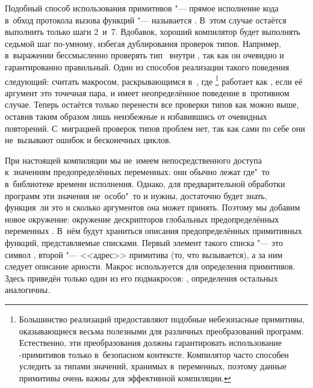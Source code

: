 Подобный способ использования примитивов "--- прямое исполнение кода в~обход
протокола вызова функций "--- называется . В~этом случае
остаётся выполнить только шаги 2~и~7. Вдобавок, хороший компилятор будет
выполнять седьмой шаг по-умному, избегая дублирования проверок типов. Например,
в~выражении  бессмысленно проверять тип~
внутри , так как он очевидно и гарантированно правильный. Один из
способов реализации такого поведения следующий: считать 
макросом, раскрывающимся в~, где \footnote{Большинство
реализаций предоставляют подобные небезопасные примитивы, оказывающиеся весьма
полезными для различных преобразований программ. Естественно, эти преобразования
должны гарантировать использование -примитивов только в~безопасном
контексте. Компилятор часто способен уследить за типами значений, хранимых
в~переменных, поэтому данные примитивы очень важны для эффективной компиляции.}
работает как , если её аргумент это точечная пара, и имеет
неопределённое поведение в~противном случае. Теперь остаётся только перенести
все проверки типов как можно выше, оставив таким образом лишь неизбежные и
избавившись от очевидных повторений. С~миграцией проверок типов проблем нет, так
как сами по себе они не~вызывают ошибок и бесконечных циклов.

При настоящей компиляции мы не~имеем непосредственного доступа к~значениям
предопределённых переменных: они обычно лежат где"~то в~библиотеке времени
исполнения. Однако, для предварительной обработки программ эти значения
не~особо"~то и нужны, достаточно будет знать, функция~ли это и сколько
аргументов она может принять. Поэтому мы добавим новое окружение: окружение
дескрипторов глобальных предопределённых переменных . В~нём будут
храниться описания предопределённых примитивных функций, представляемые
списками. Первый элемент такого списка "--- это символ , второй
"--- <<адрес>> примитива (то, что вызывается), а за ним следует описание
арности. Макрос  используется для определения примитивов.
Здесь приведён только один из его подмакросов: , определения
остальных аналогичны.

